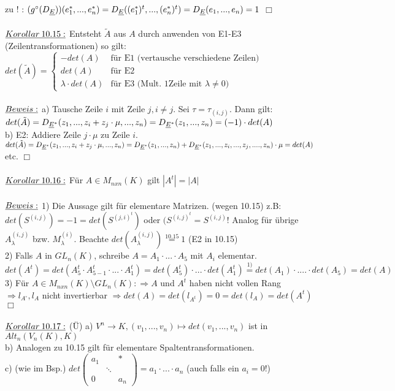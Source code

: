 \documentclass[fleqn, a4paper, 11pt]{scrartcl}
\theoremstyle{definition}
\begin{document}
zu ! : $(g^{\circ}(D_{\uline{E}}))(e_1^{\ast},...,e_n^{\ast})=D_{\uline{E}}((e_1^{\ast})^t,...,(e_n^{\ast})^t)=D_{\uline{E}}(e_1,...,e_n)=1$ \hfill $\Box$\\
\\
$\uline{Korollar\:10.15:}$ Entsteht $\tilde{A}$ aus $A$ durch anwenden von E1-E3 (Zeilentransformationen) so gilt:\\
$det(\tilde{A})=\begin{cases}
	-det(A) & \text{für E1 (vertausche verschiedene Zeilen)}\\
	det(A) & \text{für E2}\\
	\lambda\cdot det(A) & \text{für E3 (Mult. 1Zeile mit }\lambda\neq 0)
\end{cases}$\\
\\
$\uline{Beweis:}$ a) Tausche Zeile $i$ mit Zeile $j,i\neq j$. Sei $\tau=\tau_{(i,j)}$. Dann gilt: $det(\tilde{A})=D_{\uline{E}^{\ast}}(z_1,...,z_i+z_j\cdot\mu,...,z_n)=D_{\uline{E}^{\ast}}(z_1,...,z_n)=(-1)\cdot det(A)$\\
b) E2: Addiere Zeile $j\cdot\mu$ zu Zeile $i$. $det(\tilde{A})=D_{\uline{E}^{\ast}}(z_1,...,z_i+z_j\cdot\mu,...,z_n)=D_{\uline{E}^{\ast}}(z_1,...,z_n)+D_{\uline{E}^{\ast}}(z_1,...,z_i,...,z_j,....,z_n)\cdot\mu=det(A)$ etc. \hfill $\Box$\\
\\
$\uline{Korollar\:10.16:}$ Für $A\in M_{nxn}(K)$ gilt $|A^t|=|A|$\\
\\
$\uline{Beweis:}$ 1) Die Aussage gilt für elementare Matrizen. (wegen 10.15) z.B: $det(S^{(i,j)})=-1=det(S^{(j,i)^t})$ oder $(S^{(i,j)^t}=S^{(i,j)}!$ Analog für übrige $A_{\lambda}^{(i,j)}$ bzw. $M_{\lambda}^{(i)}$. Beachte $det(A_{\lambda}^{(i,j)})\stackrel{10.15}{=} 1$ (E2 in 10.15)\\
2) Falls $A$ in $GL_n(K)$, schreibe $A=A_1\cdot ...\cdot A_5$ mit $A_i$ elementar. $det(A^t)=det(A_5^t\cdot A_{5-1}^t\cdot ...\cdot A_1^t)=det(A_5^t)\cdot ...\cdot det(A_1^t)\stackrel{1)}{=}det(A_1)\cdot ....\cdot det(A_5)=det(A)$\\
3) Für $A\in M_{nxn}(K)\setminus GL_n(K):\Rightarrow A$ und $A^t$ haben nicht vollen Rang $\Rightarrow l_{A^{\circ}},l_A$ nicht invertierbar $\Rightarrow det(A)=det(l_{A^t})=0=det(l_A)=det(A^t)$ \hfill $\Box$\\
\\
$\uline{Korollar\:10.17:}$ (\"U) a) $V^n\rightarrow K,(v_1,...,v_n)\mapsto det(v_1,...,v_n)$ ist in $Alt_n(V_n(K),K)$\\
b) Analogen zu 10.15 gilt für elementare Spaltentransformationen.\\
c) (wie im Bsp.) $det\begin{pmatrix}
	a_1 & & \ast \\
	 & \ddots &\\
	 0 & & a_n
\end{pmatrix}=a_1\cdot ...\cdot a_n$ (auch falls ein $a_i=0!$)\\
\\
\end{document}
